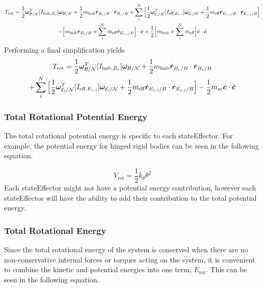\begin{multline}
T_{\text{rot}} = \frac{1}{2} \bm \omega_{\cal{B/N}}^T [I_{\text{hub},B_c}] \bm \omega_{\cal{B/N}} + \frac{1}{2} m_{\text{hub}} \dot{\bm r}_{B_c/B}\cdot\dot{\bm r}_{B_c/B} + \sum\limits_{i}^{N}\Big[\frac{1}{2} \bm \omega_{\cal{E}_{\textit{i}}/\cal{N}}^T [I_{\text{eff},E_{c,i}}] \bm \omega_{\cal{E}_{\textit{i}}/\cal{N}}
+ \frac{1}{2} m_{\text{eff}}\dot{\bm r}_{E_{c,i}/B} \cdot \dot{\bm r}_{E_{c,i}/B} \Big]\\
- \Big[ m_{\text{hub}} \dot{\bm r}_{B_c/B} + \sum\limits_{i}^{N} m_{\text{eff}} \dot{\bm r}_{E_{c,i}/B} \Big] \cdot \dot{\bm c} + \frac{1}{2} \Big[m_{\text{hub}} + \sum\limits_{i}^{N} m_{\text{eff}} \Big]\dot{\bm c} \cdot \dot{\bm c}
\end{multline}
Performing a final simplification yields
\begin{multline}
T_{\text{rot}} = \frac{1}{2} \bm \omega_{\cal{B/N}}^T [I_{\text{hub},B_c}] \bm \omega_{\cal{B/N}} + \frac{1}{2} m_{\text{hub}} \dot{\bm r}_{B_c/B}\cdot\dot{\bm r}_{B_c/B} \\
+ \sum\limits_{i}^{N}\Big[\frac{1}{2} \bm \omega_{\cal{E}_{\textit{i}}/\cal{N}}^T [I_{\text{eff},E_{c,i}}] \bm \omega_{\cal{E}_{\textit{i}}/\cal{N}}
+ \frac{1}{2} m_{\text{eff}}\dot{\bm r}_{E_{c,i}/B} \cdot \dot{\bm r}_{E_{c,i}/B} \Big]
- \frac{1}{2} m_{sc}\dot{\bm c} \cdot \dot{\bm c}
\end{multline}

\subsubsection{Total Rotational Potential Energy}

The total rotational potential energy is specific to each stateEffector. For example, the potential energy for hinged rigid bodies can be seen in the following equation.

\begin{equation}
V_{\text{rot}} = \frac{1}{2}k_{\theta} \theta^2
\end{equation}
Each stateEffector might not have a potential energy contribution, however each stateEffector will have the ability to add their contribution to the total potential energy.

\subsubsection{Total Rotational Energy}

Since the total rotational energy of the system is conserved when there are no non-conservative internal forces or torques acting on the system, it is convenient to combine the kinetic and potential energies into one term, $E_{\text{rot}}$. This can be seen in the following equation.

